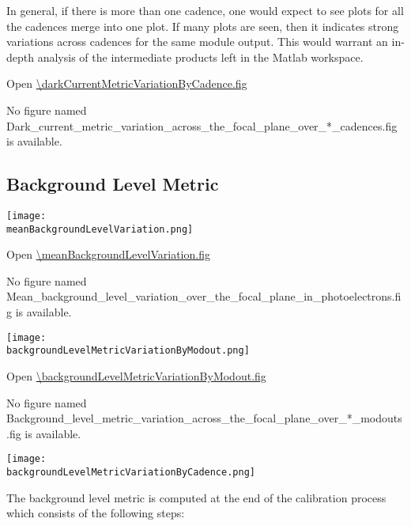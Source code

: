 In general, if there is more than one cadence, one would expect to see
plots for all the cadences merge into one plot. If many plots are
seen, then it indicates strong variations across cadences for the same
module output. This would warrant an in-depth analysis of the
intermediate products left in the Matlab workspace.

Open \url{\darkCurrentMetricVariationByCadence.fig}

\else
No figure named
Dark\_current\_metric\_variation\_across\_the\_focal\_plane\_over\_*\_cadences.fig is
available.
\fi
\clearpage

\subsection{Background Level Metric}

\ifdefined \meanBackgroundLevelVariation

\begin{center}
  \texttt{[image: \\meanBackgroundLevelVariation.png]}
\end{center}

\meanBackgroundLevelVariationCaption

Open \url{\meanBackgroundLevelVariation.fig}

\else
No figure named
Mean\_background\_level\_variation\_over\_the\_focal\_plane\_in\_photoelectrons.fig is
available.
\fi
\clearpage

\ifdefined \backgroundLevelMetricVariationByModout

\begin{center}
  \texttt{[image: \\backgroundLevelMetricVariationByModout.png]}
\end{center}

\backgroundLevelMetricVariationByModoutCaption

Open \url{\backgroundLevelMetricVariationByModout.fig}

\else
No figure named
Background\_level\_metric\_variation\_across\_the\_focal\_plane\_over\_*\_modouts.fig is
available.
\fi
\clearpage

\ifdefined \backgroundLevelMetricVariationByCadence

\begin{center}
  \texttt{[image: \\backgroundLevelMetricVariationByCadence.png]}
\end{center}

The background level metric is computed at the end of the calibration
process which consists of the following steps:

